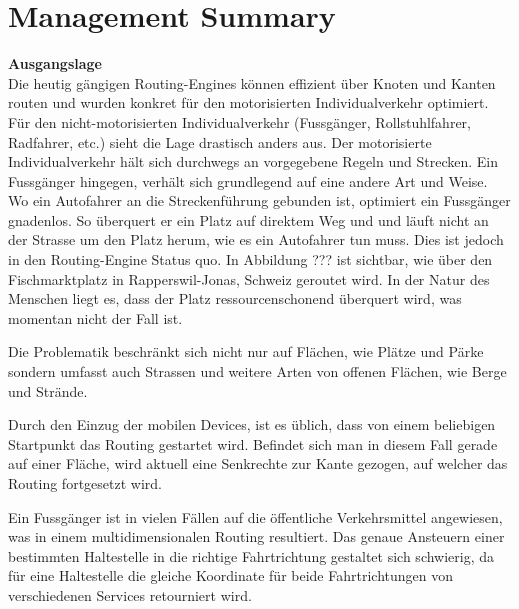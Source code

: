 
\chapter*{Management Summary}



\textbf{Ausgangslage}~\\
Die heutig gängigen Routing-Engines können effizient über Knoten und Kanten routen und wurden konkret für den motorisierten Individualverkehr optimiert. Für den nicht-motorisierten Individualverkehr (Fussgänger, Rollstuhlfahrer, Radfahrer, etc.) sieht die Lage drastisch anders aus. Der motorisierte Individualverkehr hält sich durchwegs an vorgegebene Regeln und Strecken. Ein Fussgänger hingegen, verhält sich grundlegend auf eine andere Art und Weise. Wo ein Autofahrer an die Streckenführung gebunden ist, optimiert ein Fussgänger gnadenlos. So überquert er ein Platz auf direktem Weg und und läuft nicht an der Strasse um den Platz herum, wie es ein Autofahrer tun muss. Dies ist jedoch in den Routing-Engine Status quo. In Abbildung ??? ist sichtbar, wie über den Fischmarktplatz in Rapperswil-Jonas, Schweiz geroutet wird. In der Natur des Menschen liegt es, dass der Platz ressourcenschonend überquert wird, was momentan nicht der Fall ist.

Die Problematik beschränkt sich nicht nur auf Flächen, wie Plätze und Pärke sondern umfasst auch Strassen und weitere Arten von offenen Flächen, wie Berge und Strände.

Durch den Einzug der mobilen Devices, ist es üblich, dass von einem beliebigen Startpunkt das Routing gestartet wird. Befindet sich man in diesem Fall gerade auf einer Fläche, wird aktuell eine Senkrechte zur Kante gezogen, auf welcher das Routing fortgesetzt wird.


Ein Fussgänger ist in vielen Fällen auf die öffentliche Verkehrsmittel angewiesen, was in einem multidimensionalen Routing resultiert. Das genaue Ansteuern einer bestimmten Haltestelle in die richtige Fahrtrichtung gestaltet sich schwierig, da für eine Haltestelle die gleiche Koordinate für beide Fahrtrichtungen von verschiedenen Services retourniert wird.

